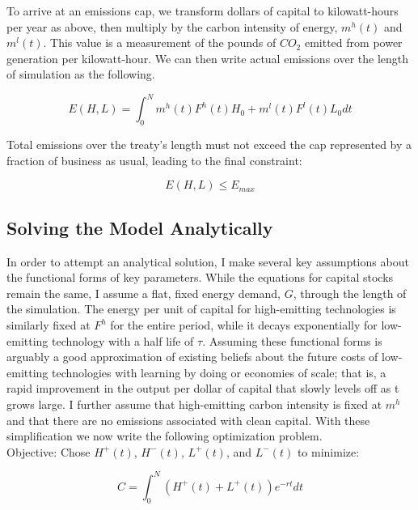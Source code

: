 \documentclass{easychithesis}
\begin{document}
To arrive at an emissions cap, we transform dollars of capital to kilowatt-hours per year as above, then multiply by the carbon intensity of energy, $m^h(t)$ and $m^l(t)$. This value is a measurement of the pounds of $CO_2$ emitted from power generation per kilowatt-hour. We can then write actual emissions over the length of simulation as the following. 

\begin{equation}\label{eq:simpleSimEmission}
E(H, L) = \int_0^N  m^h(t) F^h(t) H_0 + m^l(t) F^l(t) L_0 dt
\end{equation}

Total emissions over the treaty's length must not exceed the cap represented by a fraction of business as usual, leading to the final constraint: 

\begin{equation}\label{eq:simpleEmitConstraint}
E(H,L) \leq E_{max}
\end{equation}



\subsection{Solving the Model Analytically}

In order to attempt an analytical solution, I make several key assumptions about the functional forms of key parameters. While the equations for capital stocks remain the same, I assume a flat, fixed energy demand, $G$, through the length of the simulation. The energy per unit of capital for high-emitting technologies is similarly fixed at $F^h$ for the entire period, while it decays exponentially for low-emitting technology with a half life of $\tau$. Assuming these functional forms is arguably a good approximation of existing beliefs about the future costs of low-emitting technologies with learning by doing or economies of scale; that is, a rapid improvement in the output per dollar of capital that slowly levels off as t grows large. I further assume that high-emitting carbon intensity is fixed at $m^h$ and that there are no emissions associated with clean capital. With these simplification we now write the following optimization problem. \\

Objective: Chose $H^+(t)$, $H^-(t)$, $L^+(t)$, and $L^-(t)$ to minimize:

\begin{equation}\label{eq:analyticalObj}
C = \int_0^N (H^+(t) + L^+(t))e^{-rt} dt
\end{equation}
\end{document}
